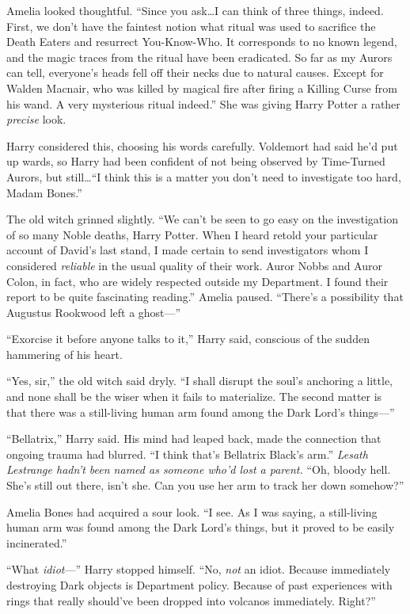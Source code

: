 Amelia looked thoughtful. “Since you ask…I can think of three things, indeed. First, we don’t have the faintest notion what ritual was used to sacrifice the Death Eaters and resurrect You-Know-Who. It corresponds to no known legend, and the magic traces from the ritual have been eradicated. So far as my Aurors can tell, everyone’s heads fell off their necks due to natural causes. Except for Walden Macnair, who was killed by magical fire after firing a Killing Curse from his wand. A very mysterious ritual indeed.” She was giving Harry Potter a rather \emph{precise} look.

Harry considered this, choosing his words carefully. Voldemort had said he’d put up wards, so Harry had been confident of not being observed by Time-Turned Aurors, but still…“I think this is a matter you don’t need to investigate too hard, Madam Bones.”

The old witch grinned slightly. “We can’t be seen to go easy on the investigation of so many Noble deaths, Harry Potter. When I heard retold your particular account of David’s last stand, I made certain to send investigators whom I considered \emph{reliable} in the usual quality of their work. Auror Nobbs and Auror Colon, in fact, who are widely respected outside my Department. I found their report to be quite fascinating reading.” Amelia paused. “There’s a possibility that Augustus Rookwood left a ghost—”

“Exorcise it before anyone talks to it,” Harry said, conscious of the sudden hammering of his heart.

“Yes, sir,” the old witch said dryly. “I shall disrupt the soul’s anchoring a little, and none shall be the wiser when it fails to materialize. The second matter is that there was a still-living human arm found among the Dark Lord’s things—”

“Bellatrix,” Harry said. His mind had leaped back, made the connection that ongoing trauma had blurred. “I think that’s Bellatrix Black’s arm.” \emph{Lesath Lestrange hadn’t been named as someone who’d lost a parent.} “Oh, bloody hell. She’s still out there, isn’t she. Can you use her arm to track her down somehow?”

Amelia Bones had acquired a sour look. “I see. As I was saying, a still-living human arm was found among the Dark Lord’s things, but it proved to be easily incinerated.”

“What \emph{idiot}—” Harry stopped himself. “No, \emph{not} an idiot. Because immediately destroying Dark objects is Department policy. Because of past experiences with rings that really should’ve been dropped into volcanos immediately. Right?”

